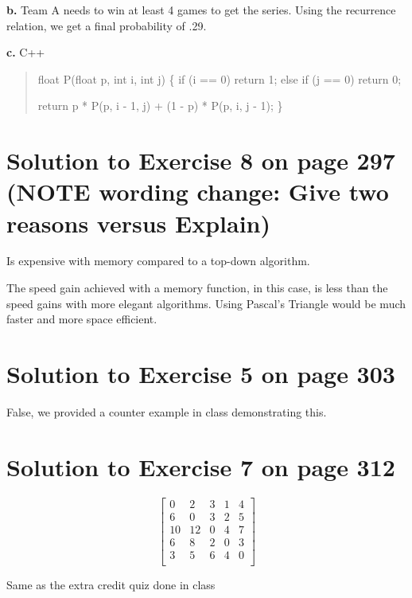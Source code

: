 \documentclass[11pt]{article}
\begin{document}
\textbf{b.} Team A needs to win at least 4 games to get the series. Using the
recurrence relation, we get a final probability of .29.

\textbf{c.} C++

\begin{verse}

   float P(float p, int i, int j)
   \{
   if (i == 0)
      return 1;
   else if (j == 0)
      return 0;

   return p * P(p, i - 1, j) + (1 - p) * P(p, i, j - 1);
   \}

\end{verse}

\section*{Solution to Exercise 8 on page 297 (NOTE wording change: Give two reasons versus Explain)}
\label{sec-5}


Is expensive with memory compared to a top-down algorithm. 

The speed gain achieved with a memory function, in this case, is less
than the speed gains with more elegant algorithms. Using Pascal's
Triangle would be much faster and more space efficient.

\section*{Solution to Exercise 5 on page 303}
\label{sec-6}


False, we provided a counter example in class demonstrating this.

\section*{Solution to Exercise 7 on page 312}
\label{sec-7}


\[\left[\begin{array}{ccccc}
  0 & 2 & 3 & 1 & 4 \\
  6 & 0 & 3 & 2 & 5 \\
  10 & 12 & 0 & 4 & 7 \\
  6 & 8 & 2 & 0 & 3 \\
  3 & 5 & 6 & 4 & 0 \\
  \end{array}\right]\]

Same as the extra credit quiz done in class
\end{document}
